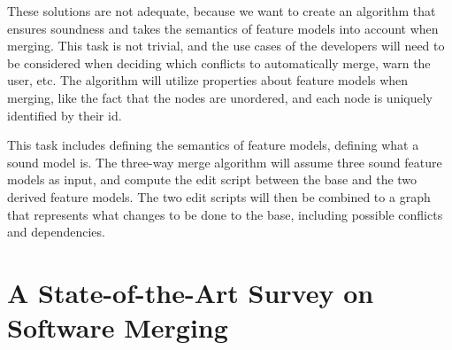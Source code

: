 \documentclass[a4paper,english]{ifimaster}
\begin{document}
These solutions are not adequate, because we want to create an algorithm that ensures soundness and takes the semantics of feature models into account when merging. This task is not trivial, and the use cases of the developers will need to be considered when deciding which conflicts to automatically merge, warn the user, etc. The algorithm will utilize properties about feature models when merging, like the fact that the nodes are unordered, and each node is uniquely identified by their id.

This task includes defining the semantics of feature models, defining what a sound model is. The three-way merge algorithm will assume three sound feature models as input, and compute the edit script between the base and the two derived feature models. The two edit scripts will then be combined to a graph that represents what changes to be done to the base, including possible conflicts and dependencies.

\section{A State-of-the-Art Survey on Software Merging}%
\label{sec:a_state_of_the_art_survey_on_software_merging}



\backmatter{}

\printbibliography{}
\end{document}
